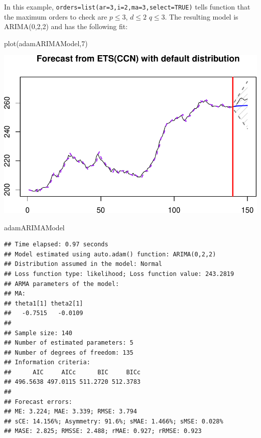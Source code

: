 \documentclass[
]{book}
\newenvironment{Shaded}{\begin{snugshade}}{\end{snugshade}}
\newcommand{\DecValTok}[1]{\textcolor[rgb]{0.00,0.00,0.81}{#1}}
\newcommand{\FunctionTok}[1]{\textcolor[rgb]{0.00,0.00,0.00}{#1}}
\newcommand{\NormalTok}[1]{#1}
\theoremstyle{definition}
\theoremstyle{definition}
\theoremstyle{definition}
\theoremstyle{definition}
\theoremstyle{remark}
\begin{document}
In this example, \texttt{orders=list(ar=3,i=2,ma=3,select=TRUE)} tells function that the maximum orders to check are \(p\leq 3\), \(d\leq 2\) \(q\leq 3\). The resulting model is ARIMA(0,2,2) and has the following fit:

\begin{Shaded}
\begin{Highlighting}[]
\FunctionTok{plot}\NormalTok{(adamARIMAModel,}\DecValTok{7}\NormalTok{)}
\end{Highlighting}
\end{Shaded}

\includegraphics{adam_files/figure-latex/unnamed-chunk-176-1.pdf}

\begin{Shaded}
\begin{Highlighting}[]
\NormalTok{adamARIMAModel}
\end{Highlighting}
\end{Shaded}

\begin{verbatim}
## Time elapsed: 0.97 seconds
## Model estimated using auto.adam() function: ARIMA(0,2,2)
## Distribution assumed in the model: Normal
## Loss function type: likelihood; Loss function value: 243.2819
## ARMA parameters of the model:
## MA:
## theta1[1] theta2[1] 
##   -0.7515   -0.0109 
## 
## Sample size: 140
## Number of estimated parameters: 5
## Number of degrees of freedom: 135
## Information criteria:
##      AIC     AICc      BIC     BICc 
## 496.5638 497.0115 511.2720 512.3783 
## 
## Forecast errors:
## ME: 3.224; MAE: 3.339; RMSE: 3.794
## sCE: 14.156%; Asymmetry: 91.6%; sMAE: 1.466%; sMSE: 0.028%
## MASE: 2.825; RMSSE: 2.488; rMAE: 0.927; rRMSE: 0.923
\end{verbatim}
\end{document}
